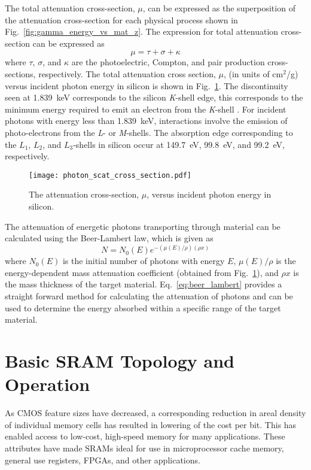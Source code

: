 The total attenuation cross-section, $\mu$, can be expressed as the superposition of the attenuation cross-section for each physical process shown in Fig.~\ref{fig:gamma_energy_vs_mat_z}.
The expression for total attenuation cross-section can be expressed as 
\begin{equation}
    \label{eq:total_photon_cs}
    \mu = \tau + \sigma + \kappa
\end{equation}
where $\tau$, $\sigma$, and $\kappa$ are the photoelectric, Compton, and pair production cross-sections, respectively.
The total attenuation cross section, $\mu$, (in units of cm$^2$/g) versus incident photon energy in silicon is shown in Fig.~\ref{fig:atten_cs_in_si}.
The discontinuity seen at 1.839~keV corresponds to the silicon \emph{K}-shell edge, this corresponds to the minimum energy required to emit an electron from the \emph{K}-shell \cite{Henke:1993tq}.
For incident photons with energy less than 1.839~keV, interactions involve the emission of photo-electrons from the \emph{L}- or \emph{M}-shells.
The absorption edge corresponding to the $L_1$, $L_2$, and $L_3$-shells in silicon occur at 149.7~eV, 99.8~eV, and 99.2~eV, respectively.

\begin{figure}[tb]
    \begin{center}
        \texttt{[image: photon\_scat\_cross\_section.pdf]}
    \end{center}
    \caption{The attenuation cross-section, $\mu$, versus incident photon energy in silicon.}
    \label{fig:atten_cs_in_si}
\end{figure}

The attenuation of energetic photons transporting through material can be calculated using the Beer-Lambert law, which is given as
\begin{equation}
    \label{eq:beer_lambert}
    N = N_0(E) e^{-(\mu(E)/\rho) (\rho x)}
\end{equation}
where $N_0(E)$ is the initial number of photons with energy $E$, $\mu(E)/\rho$ is the energy-dependent mass attenuation coefficient (obtained from Fig.~\ref{fig:atten_cs_in_si}), and $\rho x$ is the mass thickness of the target material.
Eq.~\ref{eq:beer_lambert} provides a straight forward method for calculating the attenuation of photons and can be used to determine the energy absorbed within a specific range of the target material.

\section{Basic SRAM Topology and Operation} %
\label{sec:basic_sram_topology_and_operation}
As CMOS feature sizes have decreased, a corresponding reduction in areal density of individual memory cells has resulted in lowering of the cost per bit.
This has enabled access to low-cost, high-speed memory for many applications.
These attributes have made SRAMs ideal for use in microprocessor cache memory, general use registers, FPGAs, and other applications.

